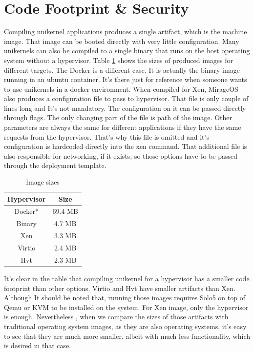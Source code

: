 \section{Code Footprint \& Security}
Compiling unikernel applications produces a single artifact, which is the machine image. That image can be booted directly with very little configuration. Many unikernels can also be compiled to a single binary that runs on the host operating system without a hypervisor. Table \ref{tab:sizes} shows the sizes of produced images for different targets. The Docker is a different case. It is actually the binary image running in an ubuntu container. It's there just for reference when someone wants to use unikernels in a docker environment. When compiled for Xen, MirageOS also produces a configuration file to pass to hypervisor. That file is only couple of lines long and It's not mandatory. The configuration on it can be passed directly through flags. The only changing part of the file is path of the image. Other parameters are always the same for different applications if they have the same requests from the hypervisor. That's why this file is omitted and it's configuration is hardcoded directly into the xen command. That additional file is also responsible for networking, if it exists, so those options have to be passed through the deployment template.


\begin{table}[htpb]
  
  \centering
  \begin{tabular}{ |c|c| }
    \toprule
      Hypervisor & Size \\
    \midrule
    Docker* & 69.4 MB \\
     
      \hline
      Binary & 4.7 MB \\
    \hline
    Xen &  3.3 MB\\
    \hline
    Virtio & 2.4 MB \\
    \hline
      Hvt & 2.3 MB\\
    \bottomrule
  \end{tabular}
  \caption[Image Sizes]{Image sizes}\label{tab:sizes}
\end{table}


It's clear in the table that compiling unikernel for a hypervisor has a smaller code footprint than other options. Virtio and Hvt have smaller artifacts than Xen. Although It should be noted that, running those images requires Solo5 on top of Qemu or KVM to be installed on the system. For Xen image, only the hypervisor is enough. Nevertheless , when we compare the sizes of those artifacts with traditional operating system images, as they are also operating systems, it's easy to see that they are much more smaller, albeit with much less functionality, which is desired in that case.

